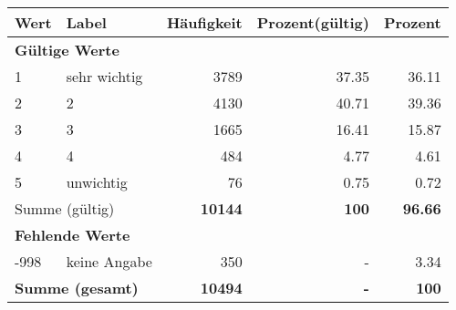     \begin{longtable}{lXrrr}
     \toprule
     \textbf{Wert} & \textbf{Label} & \textbf{Häufigkeit} & \textbf{Prozent(gültig)} & \textbf{Prozent} \\
     \endhead
     \midrule
     \multicolumn{5}{l}{\textbf{Gültige Werte}}\\

     1 &
     \multicolumn{1}{X}{ sehr wichtig   } &


       \num{3789} &
       \num[round-mode=places,round-precision=2]{37.35} &
         \num[round-mode=places,round-precision=2]{36.11} \\

     2 &
     \multicolumn{1}{X}{ 2   } &


       \num{4130} &
       \num[round-mode=places,round-precision=2]{40.71} &
         \num[round-mode=places,round-precision=2]{39.36} \\

     3 &
     \multicolumn{1}{X}{ 3   } &


       \num{1665} &
       \num[round-mode=places,round-precision=2]{16.41} &
         \num[round-mode=places,round-precision=2]{15.87} \\

     4 &
     \multicolumn{1}{X}{ 4   } &


       \num{484} &
       \num[round-mode=places,round-precision=2]{4.77} &
         \num[round-mode=places,round-precision=2]{4.61} \\

     5 &
     \multicolumn{1}{X}{ unwichtig   } &


       \num{76} &
       \num[round-mode=places,round-precision=2]{0.75} &
         \num[round-mode=places,round-precision=2]{0.72} \\
     \midrule
     \multicolumn{2}{l}{Summe (gültig)} &
       \textbf{\num{10144}} &
     \textbf{\num{100}} &
       \textbf{\num[round-mode=places,round-precision=2]{96.66}} \\
     \multicolumn{5}{l}{\textbf{Fehlende Werte}}\\
       -998 &
       keine Angabe &
         \num{350} &
        - &
         \num[round-mode=places,round-precision=2]{3.34} \\
     \midrule
     \multicolumn{2}{l}{\textbf{Summe (gesamt)}} &
          \textbf{\num{10494}} &
        \textbf{-} &
        \textbf{\num{100}} \\
     \bottomrule
     \end{longtable}
     
